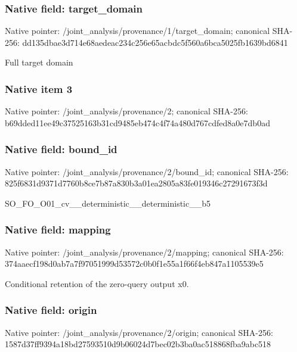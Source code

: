 \documentclass[10pt,a4paper]{article}
\begin{document}
\subsubsection{Native field: target\_\allowbreak{}domain}
Native pointer: /joint\_\allowbreak{}analysis/provenance/1/target\_\allowbreak{}domain; canonical SHA-256: dd135dbae3d714e68aedeac234c256e65acbdc5f560a6bca5025fb1639bd6841

\begingroup\raggedright\sloppy Full target domain\par\endgroup

\subsubsection{Native item 3}
Native pointer: /joint\_\allowbreak{}analysis/provenance/2; canonical SHA-256: b69dded11ee49c37525163b31cd9485eb474c4f74a480d767cdfed8a0e7db0ad

\subsubsection{Native field: bound\_\allowbreak{}id}
Native pointer: /joint\_\allowbreak{}analysis/provenance/2/bound\_\allowbreak{}id; canonical SHA-256: 825f6831d9371d7760b8ce7b87a830b3a01ea2805a83fe019346c27291673f3d

\begingroup\raggedright\sloppy SO\_\allowbreak{}FO\_\allowbreak{}O01\_\allowbreak{}cv\_\allowbreak{}\_\allowbreak{}deterministic\_\allowbreak{}\_\allowbreak{}deterministic\_\allowbreak{}\_\allowbreak{}b5\par\endgroup

\subsubsection{Native field: mapping}
Native pointer: /joint\_\allowbreak{}analysis/provenance/2/mapping; canonical SHA-256: 374aaecf198d0ab7a7f97051999d53572c0b0f1e55a1f66f4eb847a1105539e5

\begingroup\raggedright\sloppy Conditional retention of the zero-query output x0.\par\endgroup

\subsubsection{Native field: origin}
Native pointer: /joint\_\allowbreak{}analysis/provenance/2/origin; canonical SHA-256: 1587d37ff9394a18bd27593510d9b06024d7bec02b3ba0ac518868fba9abc518
\end{document}
